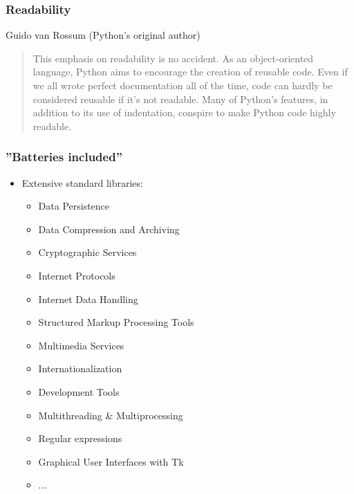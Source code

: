 \begin{frame}[fragile]
    \frametitle{Readability}
    Guido van Rossum (Python's original author)
        \begin{quote}
This emphasis on readability is no accident. As an object-oriented language, Python aims to encourage the creation of reusable code. Even if we all wrote perfect documentation all of the time, code can hardly be considered reusable if it's not readable. Many of Python’s features, in addition to its use of indentation, conspire to make Python code highly readable.
    \end{quote}
\end{frame}

\begin{frame}[fragile]
    \frametitle{''Batteries included''}
    \begin{itemize}
        \item Extensive standard libraries:
        \begin{itemize}
            \item Data Persistence
            \item Data Compression and Archiving
            \item Cryptographic Services
            \item Internet Protocols
            \item Internet Data Handling
            \item Structured Markup Processing Tools
            \item Multimedia Services
            \item Internationalization
            \item Development Tools
            \item Multithreading \& Multiprocessing
            \item Regular expressions
            \item Graphical User Interfaces with Tk
            \item ...
        \end{itemize}
    \end{itemize}
\end{frame}

